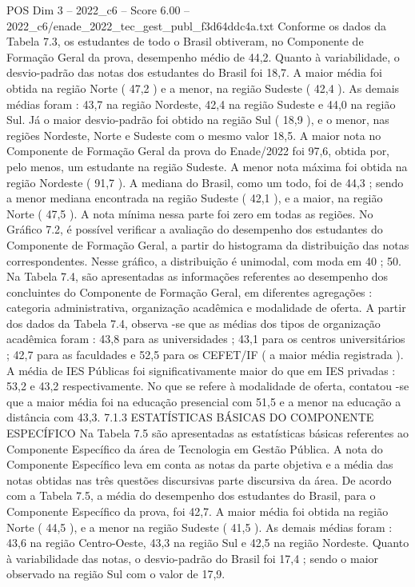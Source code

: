 \begin{textsample}{POS Dim 3 – 2022\_c6 – Score 6.00 – 2022\_c6/enade\_2022\_tec\_gest\_publ\_f3d64ddc4a.txt}
Conforme os dados da Tabela 7.3, os estudantes de todo o Brasil obtiveram, no Componente de Formação Geral da prova, desempenho médio de 44,2.
Quanto à variabilidade, o desvio-padrão das notas dos estudantes do Brasil foi 18,7.
A maior média foi obtida na região Norte ( 47,2 ) e a menor, na região Sudeste ( 42,4 ).
As demais médias foram : 43,7 na região Nordeste, 42,4 na região Sudeste e 44,0 na região Sul.
Já o maior desvio-padrão foi obtido na região Sul ( 18,9 ), e o menor, nas regiões Nordeste, Norte e Sudeste com o mesmo valor 18,5.
A maior nota no Componente de Formação Geral da prova do Enade/2022 foi 97,6, obtida por, pelo menos, um estudante na região Sudeste.
A menor nota máxima foi obtida na região Nordeste ( 91,7 ).
A mediana do Brasil, como um todo, foi de 44,3 ; sendo a menor mediana encontrada na região Sudeste ( 42,1 ), e a maior, na região Norte ( 47,5 ).
A nota mínima nessa parte foi zero em todas as regiões.
No Gráfico 7.2, é possível verificar a avaliação do desempenho dos estudantes do Componente de Formação Geral, a partir do histograma da distribuição das notas correspondentes.
Nesse gráfico, a distribuição é unimodal, com moda em 40 ; 50.
Na Tabela 7.4, são apresentadas as informações referentes ao desempenho dos concluintes do Componente de Formação Geral, em diferentes agregações : categoria administrativa, organização acadêmica e modalidade de oferta.
A partir dos dados da Tabela 7.4, observa -se que as médias dos tipos de organização acadêmica foram : 43,8 para as universidades ; 43,1 para os centros universitários ; 42,7 para as faculdades e 52,5 para os CEFET/IF ( a maior média registrada ).
A média de IES Públicas foi significativamente maior do que em IES privadas : 53,2 e 43,2 respectivamente.
No que se refere à modalidade de oferta, contatou -se que a maior média foi na educação presencial com 51,5 e a menor na educação a distância com 43,3. 7.1.3 ESTATÍSTICAS BÁSICAS DO COMPONENTE ESPECÍFICO Na Tabela 7.5 são apresentadas as estatísticas básicas referentes ao Componente Específico da área de Tecnologia em Gestão Pública.
A nota do Componente Específico leva em conta as notas da parte objetiva e a média das notas obtidas nas três questões discursivas parte discursiva da área.
De acordo com a Tabela 7.5, a média do desempenho dos estudantes do Brasil, para o Componente Específico da prova, foi 42,7.
A maior média foi obtida na região Norte ( 44,5 ), e a menor na região Sudeste ( 41,5 ).
As demais médias foram : 43,6 na região Centro-Oeste, 43,3 na região Sul e 42,5 na região Nordeste.
Quanto à variabilidade das notas, o desvio-padrão do Brasil foi 17,4 ; sendo o maior observado na região Sul com o valor de 17,9.

\end{textsample}
